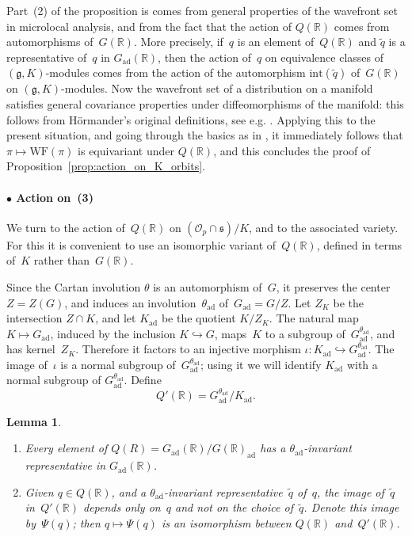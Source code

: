 \documentclass[10pt,leqno]{article}
\newtheorem{lemma}[equation]{Lemma}
\newcommand{\ad}{\mathrm{ad}}
\newcommand{\Gad}{G_\mathrm{ad}}
\newcommand{\Kad}{K_\mathrm{ad}}
\renewcommand{\O}{\mathcal O}
\newcommand{\R}{\mathbb R}
\newcommand{\g}{\mathfrak g}
\newcommand{\s}{\mathfrak s}
\newcommand{\WF}{\mathrm{WF}}
\newcommand{\Op}{\O_p}
\begin{document}
Part~(2) of the proposition is comes from general properties of the wavefront set in microlocal analysis, and from the fact that the action of $Q(\R)$ comes from automorphisms of~$G(\R)$. More precisely, if~$q$ is an element of~$Q(\R)$ and $\tilde{q}$ is a representative of~$q$ in $\Gad(\R)$, then the action of~$q$ on equivalence classes of $(\g, K)$-modules comes from the action of the automorphism $\mathrm{int}(\tilde{q})$ of~$G(\R)$ on $(\g, K)$-modules. Now the wavefront set of a distribution on a manifold satisfies general covariance properties under diffeomorphisms of the manifold: this follows from Hörmander's original definitions, see e.g. \cite[Section 2, p.~800]{HarrisHeOlafsson}. Applying this to the present situation, and going through the basics as in   \cite[Section 2]{HarrisHeOlafsson}, it immediately follows that $\pi \mapsto \WF(\pi)$ is equivariant under $Q(\R)$, and this concludes the proof of Proposition~\ref{prop:action_on_K_orbits}.

 
\paragraph*{$\bullet$ Action on~(3)} We turn to the action of~$Q(\R)$ on $(\Op \cap \s)/K$, and to the associated variety. For this it is convenient to use an isomorphic variant of~$Q(\R)$, defined in terms of~$K$ rather than~$G(\R)$. 

Since the Cartan involution $\theta$ is an automorphism of~$G$, it preserves the center~$Z=Z(G)$, and induces an involution~$\theta_{\ad}$ of~$\Gad=G/Z$. Let $Z_K$ be the intersection $Z \cap K$, and let $K_{\ad}$ be the quotient $K/Z_K$. The natural map $K \mapsto \Gad$, induced by the inclusion $K \hookrightarrow G$, maps~$K$ to a subgroup of~$\Gad^{\theta_{\ad}}$, and has kernel~$Z_K$. Therefore it factors to an injective morphism $\iota\colon \Kad \hookrightarrow\Gad^{\theta_{\ad}} $. The image of~$\iota$ is a normal subgroup of~$\Gad^{\theta_{\ad}}$; using it we will identify $\Kad$ with a normal subgroup of $\Gad^{\theta_{\ad}}$. Define
\[ Q'(\R) = \Gad^{\theta_{\ad}}/\Kad.\]

\begin{lemma}\label{lem:q_and_qprime}
\begin{enumerate}
\item Every element of $Q(R)=\Gad(\R)/G(\R)_{\ad}$ has a $\theta_\ad$-invariant representative in $\Gad(\R)$.
\item Given $q \in Q(\R)$, and a $\theta_{\ad}$-invariant representative~$\tilde{q}$ of~$q$, the image of~$\tilde{q}$ in~$Q'(\R)$ depends only on~$q$ and not on the choice of~$\tilde{q}$. Denote this image by~$\Psi(q)$; then $q \mapsto \Psi(q)$ is an isomorphism between $Q(\R)$ and~$Q'(\R)$. 
\end{enumerate}
\end{lemma}
\end{document}
